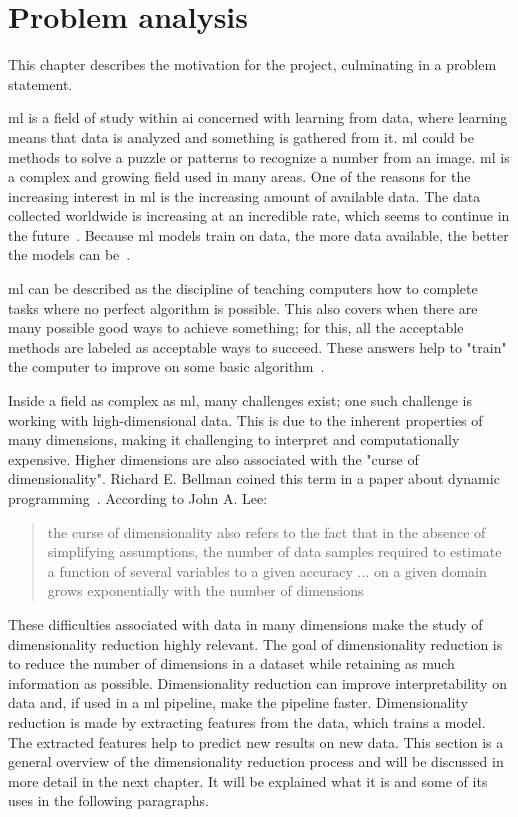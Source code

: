 \chapter{Problem analysis}\label{cha:problem-analysis}
This chapter describes the motivation for the project, culminating in a problem statement.

\gls{ml}  is a field of study within \gls{ai} concerned with learning from data, where learning means that data is analyzed and something is gathered from it. \gls{ml}  could be methods to solve a puzzle or patterns to recognize a number from an image. \gls{ml}  is a complex and growing field used in many areas. One of the reasons for the increasing interest in \gls{ml} is the increasing amount of available data. The data collected worldwide is increasing at an incredible rate, which seems to continue in the future~\cite{data-never-sleeps}. Because \gls{ml} models train on data, the more data available, the better the models can be~\cite{Unreasonable-effectiveness-of-data-Norvig}.

\gls{ml} can be described as the discipline of teaching computers how to complete tasks where no perfect algorithm is possible. This also covers when there are many possible good ways to achieve something; for this, all the acceptable methods are labeled as acceptable ways to succeed. These answers help to "train" the computer to improve on some basic algorithm~\cite{alpaydin2020introduction}.

Inside a field as complex as \gls{ml}, many challenges exist; one such challenge is working with high-dimensional data. This is due to the inherent properties of many dimensions, making it challenging to interpret and computationally expensive. Higher dimensions are also associated with the "curse of dimensionality". Richard E. Bellman coined this term in a paper about dynamic programming~\cite{bellmanrand}. According to John A. Lee: \blockcquote{nonlinear-dim-red-chapter-two}{the curse of dimensionality also refers to the fact that in the absence of simplifying assumptions, the number of data samples required to estimate a function of several variables to a given accuracy ... on a given domain grows exponentially with the number of dimensions}.

These difficulties associated with data in many dimensions make the study of dimensionality reduction highly relevant. The goal of dimensionality reduction is to reduce the number of dimensions in a dataset while retaining as much information as possible. Dimensionality reduction can improve interpretability on data and, if used in a \gls{ml} pipeline, make the pipeline faster. Dimensionality reduction is made by extracting features from the data, which trains a model. The extracted features help to predict new results on new data. This section is a general overview of the dimensionality reduction process and will be discussed in more detail in the next chapter. It will be explained what it is and some of its uses in the following paragraphs.

